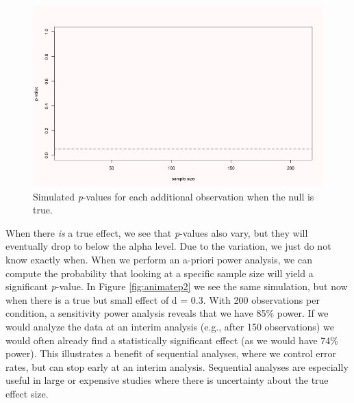 \documentclass[
  oneside]{book}
\begin{document}
\begin{figure}

{\centering \includegraphics[width=1\linewidth]{images/animatep} 

}

\caption{Simulated \emph{p}-values for each additional observation when the null is true.}\label{fig:animatep}
\end{figure}

When there \emph{is} a true effect, we see that \emph{p}-values also vary, but they will eventually drop to below the alpha level. Due to the variation, we just do not know exactly when. When we perform an a-priori power analysis, we can compute the probability that looking at a specific sample size will yield a significant \emph{p}-value. In Figure \ref{fig:animatep2} we see the same simulation, but now when there is a true but small effect of d = 0.3. With 200 observations per condition, a sensitivity power analysis reveals that we have 85\% power. If we would analyze the data at an interim analysis (e.g., after 150 observations) we would often already find a statistically significant effect (as we would have 74\% power). This illustrates a benefit of sequential analyses, where we control error rates, but can stop early at an interim analysis. Sequential analyses are especially useful in large or expensive studies where there is uncertainty about the true effect size.
\end{document}
